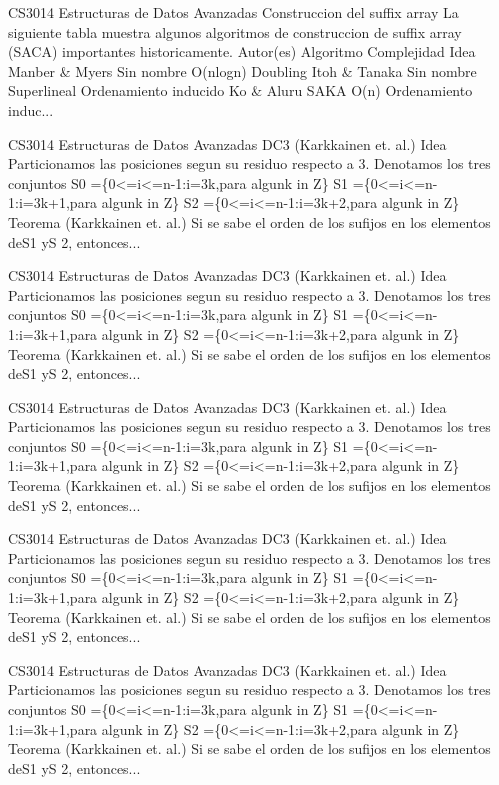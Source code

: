 \begin{description}[leftmargin=!,labelwidth=4.2em,style=nextline]
\item[Pag. 19] CS3014 Estructuras de Datos Avanzadas Construccion del suffix array La siguiente tabla muestra algunos algoritmos de construccion de suffix array (SACA) importantes historicamente. Autor(es) Algoritmo Complejidad Idea Manber \& Myers Sin nombre O(nlogn) Doubling Itoh \& Tanaka Sin nombre Superlineal Ordenamiento inducido Ko \& Aluru SAKA O(n) Ordenamiento induc...
\item[Pag. 20] CS3014 Estructuras de Datos Avanzadas DC3 (Karkkainen et. al.) Idea Particionamos las posiciones segun su residuo respecto a 3. Denotamos los tres conjuntos S0 =\{0<=i<=n-1:i=3k,para algunk in Z\} S1 =\{0<=i<=n-1:i=3k+1,para algunk in Z\} S2 =\{0<=i<=n-1:i=3k+2,para algunk in Z\} Teorema (Karkkainen et. al.) Si se sabe el orden de los sufijos en los elementos deS1 yS 2, entonces...
\item[Pag. 21] CS3014 Estructuras de Datos Avanzadas DC3 (Karkkainen et. al.) Idea Particionamos las posiciones segun su residuo respecto a 3. Denotamos los tres conjuntos S0 =\{0<=i<=n-1:i=3k,para algunk in Z\} S1 =\{0<=i<=n-1:i=3k+1,para algunk in Z\} S2 =\{0<=i<=n-1:i=3k+2,para algunk in Z\} Teorema (Karkkainen et. al.) Si se sabe el orden de los sufijos en los elementos deS1 yS 2, entonces...
\item[Pag. 22] CS3014 Estructuras de Datos Avanzadas DC3 (Karkkainen et. al.) Idea Particionamos las posiciones segun su residuo respecto a 3. Denotamos los tres conjuntos S0 =\{0<=i<=n-1:i=3k,para algunk in Z\} S1 =\{0<=i<=n-1:i=3k+1,para algunk in Z\} S2 =\{0<=i<=n-1:i=3k+2,para algunk in Z\} Teorema (Karkkainen et. al.) Si se sabe el orden de los sufijos en los elementos deS1 yS 2, entonces...
\item[Pag. 23] CS3014 Estructuras de Datos Avanzadas DC3 (Karkkainen et. al.) Idea Particionamos las posiciones segun su residuo respecto a 3. Denotamos los tres conjuntos S0 =\{0<=i<=n-1:i=3k,para algunk in Z\} S1 =\{0<=i<=n-1:i=3k+1,para algunk in Z\} S2 =\{0<=i<=n-1:i=3k+2,para algunk in Z\} Teorema (Karkkainen et. al.) Si se sabe el orden de los sufijos en los elementos deS1 yS 2, entonces...
\item[Pag. 24] CS3014 Estructuras de Datos Avanzadas DC3 (Karkkainen et. al.) Idea Particionamos las posiciones segun su residuo respecto a 3. Denotamos los tres conjuntos S0 =\{0<=i<=n-1:i=3k,para algunk in Z\} S1 =\{0<=i<=n-1:i=3k+1,para algunk in Z\} S2 =\{0<=i<=n-1:i=3k+2,para algunk in Z\} Teorema (Karkkainen et. al.) Si se sabe el orden de los sufijos en los elementos deS1 yS 2, entonces...

\end{description}
